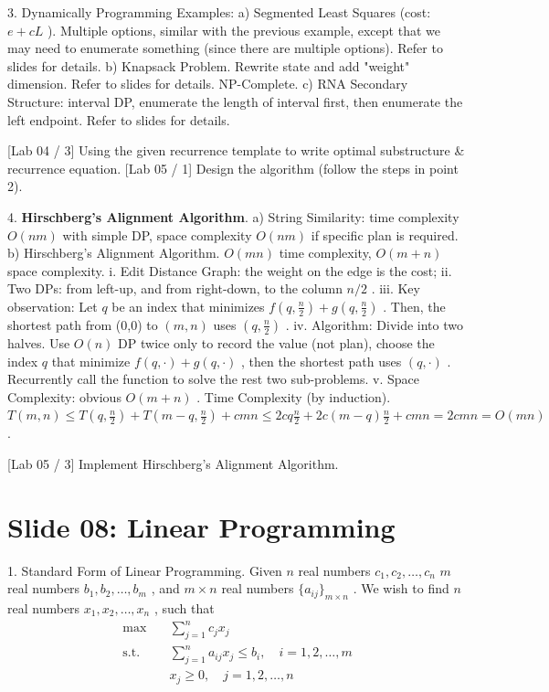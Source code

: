 \documentclass[10pt,a4paper]{article}
\begin{document}
3. Dynamically Programming Examples:
a) Segmented Least Squares (cost: \(e + cL\) ). Multiple options, similar with the previous example, except that we may need to enumerate something (since there are multiple options). Refer to slides for details.
b) Knapsack Problem. Rewrite state and add "weight" dimension. Refer to slides for details. NP-Complete.
c) RNA Secondary Structure: interval DP, enumerate the length of interval first, then enumerate the left endpoint. Refer to slides for details.

[Lab 04 / 3] Using the given recurrence template to write optimal substructure \& recurrence equation.
[Lab 05 / 1] Design the algorithm (follow the steps in point 2).

4. \textbf{Hirschberg's Alignment Algorithm}.
a) String Similarity: time complexity \(O(nm)\) with simple DP, space complexity \(O(nm)\) if specific plan is required.
b) Hirschberg's Alignment Algorithm. \(O(mn)\) time complexity, \(O(m + n)\) space complexity.
    i. Edit Distance Graph: the weight on the edge is the cost;
    ii. Two DPs: from left-up, and from right-down, to the column \(n / 2\) .
    iii. Key observation: Let \(q\) be an index that minimizes \(f\left(q,\frac{n}{2}\right) + g\left(q,\frac{n}{2}\right)\) . Then, the shortest path from (0,0) to \((m,n)\) uses \(\left(q,\frac{n}{2}\right)\) .
    iv. Algorithm: Divide into two halves. Use \(O(n)\) DP twice only to record the value (not plan), choose the index \(q\) that minimize \(f(q,\cdot) + g(q,\cdot)\) , then the shortest path uses \((q,\cdot)\) . Recurrently call the function to solve the rest two sub-problems.
    v. Space Complexity: obvious \(O(m + n)\) . Time Complexity (by induction). \(T(m,n)\leq T\left(q,\frac{n}{2}\right) + T\left(m - q,\frac{n}{2}\right) + cmn\leq 2cq\frac{n}{2} +2c(m - q)\frac{n}{2} +cmn = 2cmn = O(mn)\).

[Lab 05 / 3] Implement Hirschberg's Alignment Algorithm.

\section*{Slide 08: Linear Programming}

1. Standard Form of Linear Programming. Given \(n\) real numbers \(c_{1},c_{2},\dots,c_{n}\) \(m\) real numbers \(b_{1},b_{2},\dots,b_{m}\) , and \(m\times n\) real numbers \(\{a_{ij}\}_{m\times n}\) . We wish to find \(n\) real numbers \(x_{1},x_{2},\dots,x_{n}\) , such that
\begin{align*}
\max \quad & \sum_{j = 1}^{n}c_{j}x_{j} \\
\text{s.t.} \quad & \sum_{j = 1}^{n}a_{ij}x_{j}\leq b_{i},\quad i = 1,2,\dots ,m \\
& x_{j}\geq 0,\quad j = 1,2,\dots ,n
\end{align*}
\end{document}

